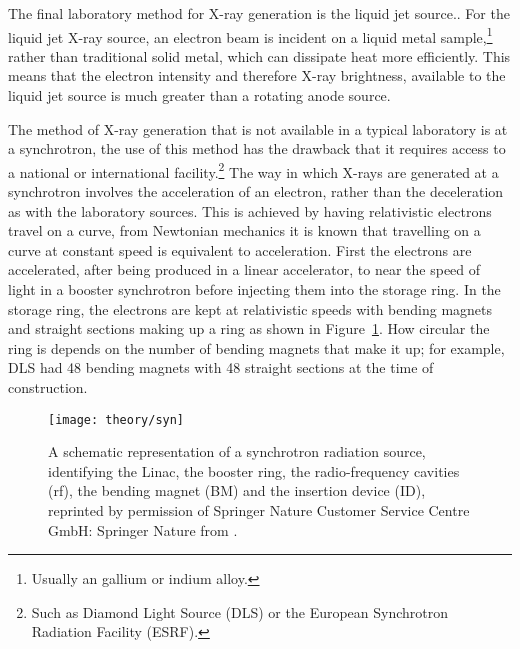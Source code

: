The final laboratory method for X-ray generation is the liquid jet source.\autocite[][Branded MetalJet by excillum]{noauthor_metaljet_nodate}.
For the liquid jet X-ray source, an electron beam is incident on a liquid metal sample,\footnote{Usually an gallium or indium alloy.} rather than traditional solid metal, which can dissipate heat more efficiently.
This means that the electron intensity and therefore X-ray brightness, available to the liquid jet source is much greater than a rotating anode source.

The method of X-ray generation that is not available in a typical laboratory is at a synchrotron, the use of this method has the drawback that it requires access to a national or international facility.\footnote{Such as Diamond Light Source (DLS) or the European Synchrotron Radiation Facility (ESRF).}
The way in which X-rays are generated at a synchrotron involves the acceleration of an electron, rather than the deceleration as with the laboratory sources.
This is achieved by having relativistic electrons travel on a curve, from Newtonian mechanics it is known that travelling on a curve at constant speed is equivalent to acceleration.
First the electrons are accelerated, after being produced in a linear accelerator, to near the speed of light in a booster synchrotron before injecting them into the storage ring.
In the storage ring, the electrons are kept at relativistic speeds with bending magnets and straight sections making up a ring as shown in Figure~\ref{fig:syn}.
How circular the ring is depends on the number of bending magnets that make it up; for example, DLS had \num{48} bending magnets with \num{48} straight sections at the time of construction.
%
\begin{figure}
    \centering
    \texttt{[image: theory/syn]}
    \caption{A schematic representation of a synchrotron radiation source, identifying the Linac, the booster ring, the radio-frequency cavities (rf), the bending magnet (BM) and the insertion device (ID), reprinted by permission of Springer Nature Customer Service Centre GmbH: Springer Nature from \cite{garcia-gutierrez_bases_2009}.}
    \label{fig:syn}
\end{figure}
%

